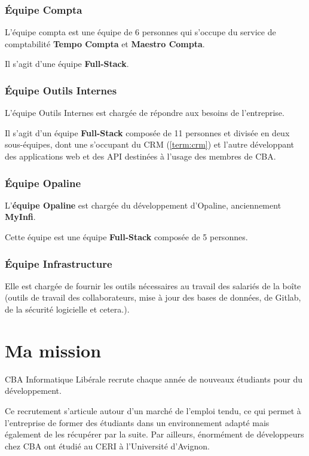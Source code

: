 \documentclass{article}
\begin{document}
\subsubsection{Équipe Compta}
L'équipe compta est une équipe de 6 personnes qui s'occupe du service de comptabilité \textbf{Tempo Compta} et \textbf{Maestro Compta}.

Il s'agit d'une équipe \textbf{Full-Stack}.

\subsubsection{Équipe Outils Internes}
L'équipe Outils Internes est chargée de répondre aux besoins de l'entreprise.

Il s'agit d'un équipe \textbf{Full-Stack} composée de 11 personnes et divisée en deux sous-équipes, dont une s'occupant du CRM (\ref{term:crm}) et l'autre développant des applications web et des API destinées à l'usage des membres de CBA.

\subsubsection{Équipe Opaline}
L'\textbf{équipe Opaline} est chargée du développement d'Opaline, anciennement \textbf{MyInfi}.

Cette équipe est une équipe \textbf{Full-Stack} composée de 5 personnes.

\subsubsection{Équipe Infrastructure}
Elle est chargée de fournir les outils nécessaires au travail des salariés de la boîte (outils de travail des collaborateurs, mise à jour des bases de données, de Gitlab, de la sécurité logicielle et cetera.).

\newpage

\section{Ma mission}

CBA Informatique Libérale recrute chaque année de nouveaux étudiants pour du développement.

Ce recrutement s'articule autour d'un marché de l'emploi tendu, ce qui permet à l'entreprise de former des étudiants dans un environnement adapté mais également de les récupérer par la suite. Par ailleurs, énormément de développeurs chez CBA ont étudié au CERI à l'Université d'Avignon.
\end{document}
